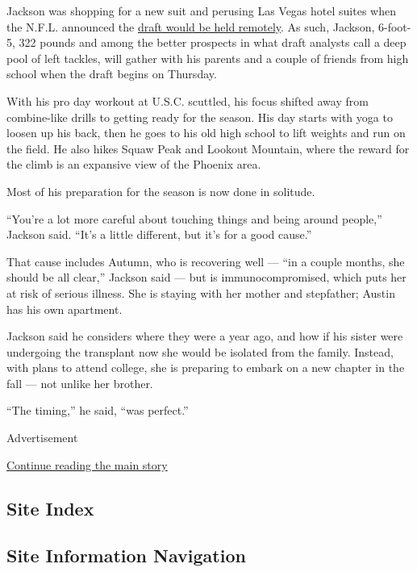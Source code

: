 Jackson was shopping for a new suit and perusing Las Vegas hotel suites
when the N.F.L. announced the
\href{https://www.nytimes3xbfgragh.onion/2020/04/14/sports/football/nfl-draft-virtual.html}{draft
would be held remotely}. As such, Jackson, 6-foot-5, 322 pounds and
among the better prospects in what draft analysts call a deep pool of
left tackles, will gather with his parents and a couple of friends from
high school when the draft begins on Thursday.

With his pro day workout at U.S.C. scuttled, his focus shifted away from
combine-like drills to getting ready for the season. His day starts with
yoga to loosen up his back, then he goes to his old high school to lift
weights and run on the field. He also hikes Squaw Peak and Lookout
Mountain, where the reward for the climb is an expansive view of the
Phoenix area.

Most of his preparation for the season is now done in solitude.

``You're a lot more careful about touching things and being around
people,'' Jackson said. ``It's a little different, but it's for a good
cause.''

That cause includes Autumn, who is recovering well --- ``in a couple
months, she should be all clear,'' Jackson said --- but is
immunocompromised, which puts her at risk of serious illness. She is
staying with her mother and stepfather; Austin has his own apartment.

Jackson said he considers where they were a year ago, and how if his
sister were undergoing the transplant now she would be isolated from the
family. Instead, with plans to attend college, she is preparing to
embark on a new chapter in the fall --- not unlike her brother.

``The timing,'' he said, ``was perfect.''

Advertisement

\protect\hyperlink{after-bottom}{Continue reading the main story}

\hypertarget{site-index}{%
\subsection{Site Index}\label{site-index}}

\hypertarget{site-information-navigation}{%
\subsection{Site Information
Navigation}\label{site-information-navigation}}

